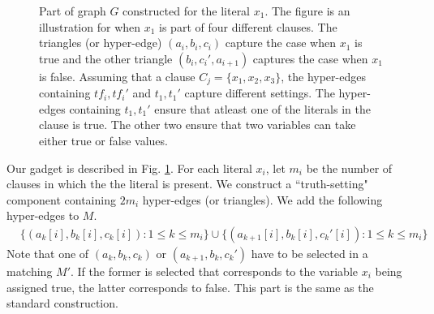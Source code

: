\begin{figure}[!ht]
  	\caption{Part of graph $G$ constructed for the literal $x_1$. The figure is an illustration for when $x_1$ is part of four different clauses. The triangles (or hyper-edge) $(a_i, b_i, c_i)$ capture the case when $x_1$ is true and the other triangle $(b_i, c_i', a_{i+1})$ captures the case when $x_1$ is false. Assuming that a clause $C_j = \{x_1, x_2, x_3\}$, the hyper-edges containing $tf_i, tf_i'$ and $t_1, t_1'$ capture different settings. The hyper-edges containing $t_1, t_1'$ ensure that atleast one of the literals in the clause is true. The other two ensure that two variables can take either true or false values.}
\label{fig:3DMQueries}
\end{figure}

Our gadget is described in Fig. \ref{fig:3DMQueries}. For each literal $x_i$, let $m_i$ be the number of clauses in which the the literal is present. We construct a ``truth-setting" component containing $2m_i$ hyper-edges (or triangles). We add the following hyper-edges to $M$.
\begin{align*}
  &\{(a_k[i], b_k[i], c_k[i]): 1 \le k \le m_i\} \cup \{(a_{k+1}[i], b_k[i], c_k'[i]): 1 \le k \le m_i\}
\end{align*}
Note that one of $(a_k, b_k, c_k)$ or $(a_{k+1}, b_k, c_k')$ have to be selected in a matching $M'$. If the former is selected that corresponds to the variable $x_i$ being assigned true, the latter corresponds to false. This part is the same as the standard construction. 

